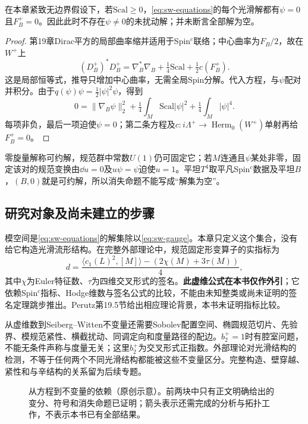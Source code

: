 \begin{proposition}\label{prop:sw-vanishing}
在本章紧致无边界假设下，若$\mathrm{Scal}\geq0$，\eqref{eq:sw-equations}的每个光滑解都有$\psi=0$且$F_B^+=0$。因此此时不存在$\psi\ne0$的未扰动解；并未断言全部解为空。
\end{proposition}
\begin{proof}
第19章Dirac平方的局部曲率缩并适用于Spin$^c$联络；中心曲率为$F_B/2$，故在$W^+$上
\[
 (D_B^+)^*D_B^+=\nabla_B^*\nabla_B+\tfrac14\mathrm{Scal}
 +\tfrac12 c(F_B^+).
\]
这是局部恒等式，推导只增加中心曲率，无需全局Spin分解。代入方程，与$\psi$配对并积分。由于$q(\psi)\psi=\tfrac12|\psi|^2\psi$，得到
\begin{equation}\label{eq:sw-integrated}
 0=\|\nabla_B\psi\|_2^2+\tfrac14\int_M\mathrm{Scal}|\psi|^2
 +\tfrac14\int_M|\psi|^4.
\end{equation}
每项非负，最后一项迫使$\psi=0$；第二条方程及$c:i\Lambda^+\to\operatorname{Herm}_0(W^+)$单射再给$F_B^+=0$。
\end{proof}

零旋量解称可约解，规范群中常数$U(1)$仍可固定它；若$M$连通且$\psi$某处非零，固定该对的规范变换由$\dd u=0$及$u\psi=\psi$迫使$u=1$。平坦$T^4$取平凡Spin$^c$数据及平坦$B$，$(B,0)$就是可约解，所以消失命题不能写成“解集为空”。

\subsection{研究对象及尚未建立的步骤}
模空间是\eqref{eq:sw-equations}的解集除以\eqref{eq:sw-gauge}。本章只定义这个集合，没有给它构造光滑流形结构。在完整外部理论中，规范固定形变算子的实指标为
\[
 d=\frac{\langle c_1(L)^2,[M]\rangle-(2\chi(M)+3\tau(M))}{4},
\]
其中$\chi$为Euler特征数、$\tau$为四维交叉形式的签名。\textbf{此虚维公式在本书仅作外引}；它依赖Spin$^c$指标、Hodge维数与签名公式的比较，不能由未知整类或尚未证明的签名定理跳步推出。Perutz第19.5节给出相应理论背景，本书未证明指标比较。

从虚维数到Seiberg--Witten不变量还需要Sobolev配置空间、椭圆规范切片、先验界、模规范紧性、横截扰动、同调定向和度量路径的配边。$b_2^+=1$时有腔室问题，不能无条件声称与度量无关；这里$b_2^+$为交叉形式正指数。外部理论对光滑结构的检测，不等于任何两个不同光滑结构都能被这些不变量区分。完整构造、壁穿越、紧性和与辛结构的关系留为后续专题。

\begin{figure}[htbp]
 \centering
 \caption{从方程到不变量的依赖（原创示意）。前两块中只有正文明确给出的变分、符号和消失命题已证明；箭头表示还需完成的分析与拓扑工作，不表示本书已有全部结果。}
\end{figure}
